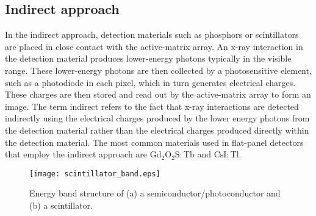 \subsection{Indirect approach}
In the indirect approach, detection materials such as phosphors or scintillators are placed in close contact with the active-matrix array.  An x-ray interaction in the detection material produces lower-energy photons typically in the visible range.  These lower-energy photons are then collected by a photosensitive element, such as a photodiode in each pixel, which in turn generates electrical charges.  These charges are then stored and read out by the active-matrix array to form an image.  The term indirect refers to the fact that x-ray interactions are detected indirectly using the electrical charges produced by the lower energy photons from the detection material rather than the electrical charges produced directly within the detection material.  The most common materials used in flat-panel detectors that employ the indirect approach are $\mathrm{Gd_2O_2S:Tb}$ and $\mathrm{CsI:Tl}$.

\begin{figure}[h]
\centering
\texttt{[image: scintillator\_band.eps]}
\caption{Energy band structure of (a) a semiconductor/photoconductor and (b) a scintillator.}
\label{fig:scintillator_band}
\end{figure}

